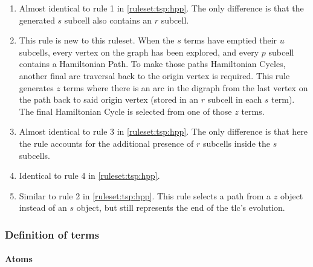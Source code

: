 \begin{enumerate}
    \item Almost identical to rule 1 in \cref{ruleset:tsp:hpp}.  The only difference is that the generated \(s\) subcell also contains an \(r\) subcell.
    \item This rule is new to this \gls{ruleset}.  When the \(s\) terms have emptied their \(u\) subcells, every vertex on the graph has been explored, and every \(p\) subcell contains a Hamiltonian Path.  To make those paths Hamiltonian Cycles, another final arc traversal back to the origin vertex is required.  This rule generates \(z\) terms where there is an arc in the digraph from the last vertex on the path back to said origin vertex (stored in an \(r\) subcell in each \(s\) term).  The final Hamiltonian Cycle is selected from one of those \(z\) terms.
    \item Almost identical to rule 3 in \cref{ruleset:tsp:hpp}.  The only difference is that here the rule accounts for the additional presence of \(r\) subcells inside the \(s\) subcells.
    \item Identical to rule 4 in \cref{ruleset:tsp:hpp}.
    \item Similar to rule 2 in \cref{ruleset:tsp:hpp}.  This rule selects a path from a \(z\) object instead of an \(s\) object, but still represents the end of the \gls{tlc}'s evolution.
\end{enumerate}

\subsubsection{Definition of terms}

\paragraph{Atoms}
\begin{description}
\end{description}


